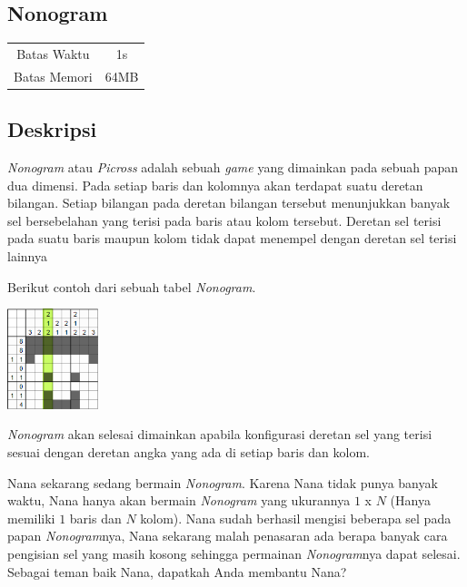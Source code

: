 \documentclass{article}
\begin{document}
\begin{center}
    \section*{Nonogram} %

    \begin{tabular}{ | c c | }
        \hline
        Batas Waktu  & 1s \\    %
        Batas Memori & 64MB \\  %
        \hline
    \end{tabular}
\end{center}

\subsection*{Deskripsi}

\textit{Nonogram} atau \textit{Picross} adalah sebuah \textit{game} yang dimainkan pada sebuah papan dua dimensi.
Pada setiap baris dan kolomnya akan terdapat suatu deretan bilangan.
Setiap bilangan pada deretan bilangan tersebut menunjukkan banyak sel bersebelahan 
yang terisi pada baris atau kolom tersebut. Deretan sel terisi pada suatu baris maupun kolom tidak 
dapat menempel dengan deretan sel terisi lainnya

Berikut contoh dari sebuah tabel \textit{Nonogram}.

\includegraphics[width=100px]{Nonogram-Steve}

 \textit{Nonogram} akan selesai dimainkan apabila konfigurasi deretan sel yang terisi 
sesuai dengan deretan angka yang ada di setiap baris dan kolom.

Nana sekarang sedang bermain \textit{Nonogram}. Karena Nana tidak punya banyak waktu, 
Nana hanya akan bermain \textit{Nonogram} yang ukurannya $1$ x $N$ (Hanya memiliki $1$ baris dan $N$ kolom). 
Nana sudah berhasil mengisi beberapa sel pada papan \textit{Nonogram}nya, Nana sekarang malah penasaran ada 
berapa banyak cara pengisian sel yang masih kosong sehingga permainan \textit{Nonogram}nya dapat selesai. Sebagai teman baik Nana, dapatkah Anda membantu Nana?
\end{document}
